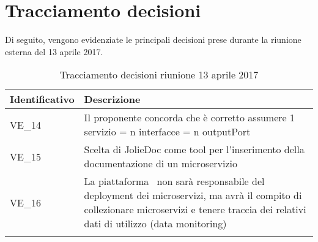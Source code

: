 \section{Tracciamento decisioni}
Di seguito, vengono evidenziate le principali decisioni prese durante la riunione esterna del 13 aprile 2017.

\begin{longtable}{|>{\centering\arraybackslash}p{4cm}|>{\centering\arraybackslash}p{9cm}|}
	\hline \rowcolor{Gray}
	\textbf{Identificativo} & \textbf{Descrizione}\\
	\hline
	\endhead
			VE\_14	&  Il proponente concorda che è corretto assumere 1 servizio = n interfacce = n outputPort \\
			\hline
			VE\_15 &  Scelta di JolieDoc come tool per l'inserimento della documentazione di un microservizio \\
			\hline
			VE\_16 & La piattaforma \progetto\ non sarà responsabile del deployment dei microservizi, ma avrà il compito di collezionare microservizi e tenere traccia dei relativi dati di utilizzo (data monitoring) \\
			\hline
		\caption{Tracciamento decisioni riunione 13 aprile 2017}
\end{longtable}